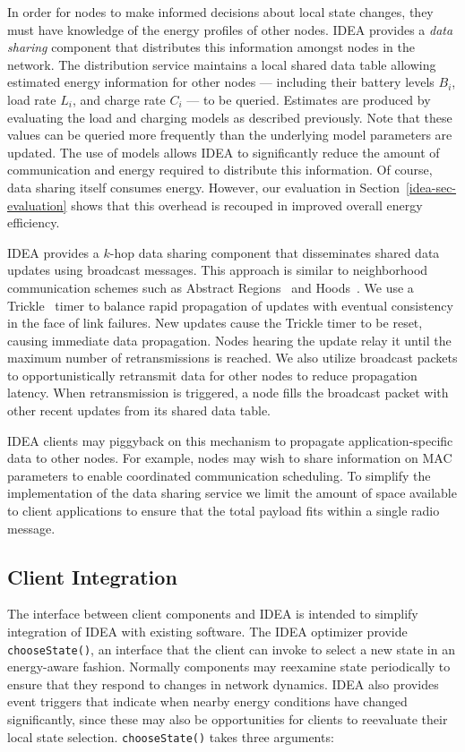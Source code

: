 In order for nodes to make informed decisions about local state changes, they
must have knowledge of the energy profiles of other nodes. IDEA provides a
\textit{data sharing} component that distributes this information amongst
nodes in the network. The distribution service maintains a local shared data
table allowing estimated energy information for other nodes --- including
their battery levels $B_i$, load rate $L_i$, and charge rate $C_i$ --- to be
queried. Estimates are produced by evaluating the load and charging models as
described previously. Note that these values can be queried more frequently
than the underlying model parameters are updated. The use of models allows
IDEA to significantly reduce the amount of communication and energy required
to distribute this information. Of course, data sharing itself consumes
energy. However, our evaluation in Section~\ref{idea-sec-evaluation} shows
that this overhead is recouped in improved overall energy efficiency. 

IDEA provides a $k$-hop data sharing component that disseminates shared data
updates using broadcast messages. This approach is similar to neighborhood
communication schemes such as Abstract Regions~\cite{regions-nsdi04} and
Hoods~\cite{hoods-mobisys}. We use a Trickle~\cite{trickle} timer to balance
rapid propagation of updates with eventual consistency in the face of link
failures. New updates cause the Trickle timer to be reset, causing immediate
data propagation. Nodes hearing the update relay it until the maximum number
of retransmissions is reached. We also utilize broadcast packets to
opportunistically retransmit data for other nodes to reduce propagation
latency. When retransmission is triggered, a node fills the broadcast packet
with other recent updates from its shared data table.

IDEA clients may piggyback on this mechanism to propagate
application-specific data to other nodes. For example, nodes may wish to
share information on MAC parameters to enable coordinated communication
scheduling. To simplify the implementation of the data sharing service we
limit the amount of space available to client applications to ensure that the
total payload fits within a single radio message.

\subsection{Client Integration}

The interface between client components and IDEA is intended to simplify
integration of IDEA with existing software. The IDEA optimizer provide
\texttt{chooseState()}, an interface that the client can invoke to select a
new state in an energy-aware fashion. Normally components may reexamine state
periodically to ensure that they respond to changes in network dynamics. IDEA
also provides event triggers that indicate when nearby energy conditions have
changed significantly, since these may also be opportunities for clients to
reevaluate their local state selection. \texttt{chooseState()} takes three
arguments:

